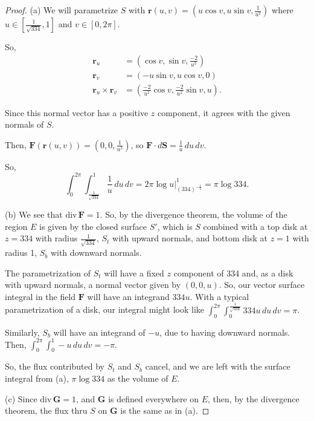 \documentclass[../hw10]{subfiles}
\begin{document}
\begin{proof}
	(a) We will parametrize $S$ with  $\mathbf{r}(u,v) = (u\cos{v},u\sin{v},\frac{1}{u^2})$ where $u\in [\frac{1}{\sqrt{334}}, 1]$ and $v\in [0,2\pi]$.

	So,
	\begin{align*}
		\mathbf{r}_u                   & = (\cos{v},\sin{v},\frac{-2}{u^3})                               \\
		\mathbf{r}_v                   & = (-u\sin{v},u\cos{v},0)                                         \\
		\mathbf{r}_u\times\mathbf{r}_v & = \left( \frac{-2}{u^2}\cos{v}, \frac{-2}{u^2}\sin{v}, u \right)
		.\end{align*}

	Since this normal vector has a positive $z$ component, it agrees with the given normals of $S$.

	Then,  $\mathbf{F}(\mathbf{r}(u,v)) = (0,0,\frac{1}{u^2})$, so $\mathbf{F}\cdot d\mathbf{S} = \frac{1}{u}\,du\,dv$.

	So, \[
		\int_{0}^{2\pi} \int_{\frac{1}{\sqrt{334}}}^{1} \frac{1}{u} \,du \,dv
		= 2\pi \log{u}\big\vert_{{(334)}^{-\frac{1}{2}}}^1
		= \pi\log 334
		.\]

	(b) We see that $\text{div}\,\mathbf{F} = 1$.
	So, by the divergence theorem, the volume of the region $E$ is given by the closed surface  $S'$, which is  $S$ combined with a top disk at $z=334$ with radius $\frac{1}{\sqrt{334}}$, $S_t$ with upward normals, and bottom disk at $z=1$ with radius 1, $S_b$ with downward normals.

	The parametrization of $S_t$ will have a fixed $z$ component of 334 and, as a disk with upward normals, a normal vector given by $(0,0,u)$.
	So, our vector surface integral in the field $\mathbf{F}$ will have an integrand $334u$.
	With a typical parametrization of a disk, our integral might look like $\int_{0}^{2\pi} \int_{0}^{\frac{1}{\sqrt{334}}} 334u \,du \,dv = \pi$.

	Similarly, $S_b$ will have an integrand of $-u$, due to having downward normals.
	Then, $\int_{0}^{2\pi} \int_{0}^{1} -u \,du  \,dv = -\pi$.

	So, the flux contributed by $S_t$ and $S_b$ cancel, and we are left with the surface integral from (a),  $\pi\log 334$ as the volume of $E$.

	(c) Since $\text{div}\,\mathbf{G} = 1$, and $\mathbf{G}$ is defined everywhere on $E$, then, by the divergence theorem, the flux thru $S$ on  $\mathbf{G}$ is the same as in (a).
\end{proof}
\end{document}
